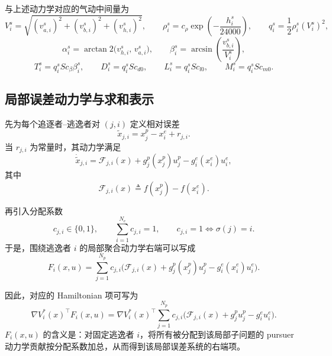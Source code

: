 \documentclass[11pt,a4paper]{article}
\begin{document}
与上述动力学对应的气动中间量为
\begin{equation}
V_i^s=\sqrt{(v_{a,i}^s)^2+(v_{b,i}^s)^2+(v_{h,i}^s)^2},
\qquad
\rho_i^s=c_\rho \exp\!\left(-\frac{h_i^s}{24000}\right),
\qquad
q_i^s=\frac{1}{2}\rho_i^s (V_i^s)^2,
\end{equation}
\begin{equation}
\alpha_i^s=\arctan2\!\big(v_{h,i}^s,\,v_{a,i}^s\big),
\qquad
\beta_i^s=\arcsin\!\left(\frac{v_{b,i}^s}{V_i^s}\right),
\end{equation}
\begin{equation}
T_i^s=q_i^s S c_\beta \beta_i^s,
\qquad
D_i^s=q_i^s S c_{d0},
\qquad
L_i^s=q_i^s S c_{l0},
\qquad
M_i^s=q_i^s S c_{m0}.
\label{eq:aero_terms}
\end{equation}

\subsection{局部误差动力学与求和表示}

先为每个追逐者--逃逸者对 $(j,i)$ 定义相对误差
\begin{equation}
\tilde x_{j,i}=x_j^p-x_i^e+r_{j,i}.
\label{eq:pairwise_error}
\end{equation}
当 $r_{j,i}$ 为常量时，其动力学满足
\begin{equation}
\dot{\tilde x}_{j,i}
=
\mathcal F_{j,i}(x)+g_j^p(x_j^p)u_j^p-g_i^e(x_i^e)u_i^e,
\label{eq:pairwise_error_dynamics}
\end{equation}
其中
\begin{equation}
\mathcal F_{j,i}(x)\triangleq f(x_j^p)-f(x_i^e).
\label{eq:pairwise_drift}
\end{equation}

再引入分配系数
\begin{equation}
c_{j,i}\in\{0,1\},
\qquad
\sum_{i=1}^{N_e} c_{j,i}=1,
\qquad
c_{j,i}=1 \Longleftrightarrow \sigma(j)=i.
\label{eq:assignment_indicator}
\end{equation}
于是，围绕逃逸者 $i$ 的局部聚合动力学右端可以写成
\begin{equation}
F_i(x,u)=
\sum_{j=1}^{N_p}
c_{j,i}
\Big(
\mathcal F_{j,i}(x)+g_j^p(x_j^p)u_j^p-g_i^e(x_i^e)u_i^e
\Big).
\label{eq:F_local_sum}
\end{equation}

因此，对应的 Hamiltonian 项可写为
\begin{equation}
\nabla V_i^*(x)^\top F_i(x,u)
=
\nabla V_i^*(x)^\top
\sum_{j=1}^{N_p}
c_{j,i}
\Big(
\mathcal F_{j,i}(x)+g_j^p u_j^p-g_i^e u_i^e
\Big).
\label{eq:hji_sum_term}
\end{equation}
$F_i(x,u)$ 的含义是：对固定逃逸者 $i$，将所有被分配到该局部子问题的 pursuer 动力学贡献按分配系数加总，从而得到该局部误差系统的右端项。
\end{document}
